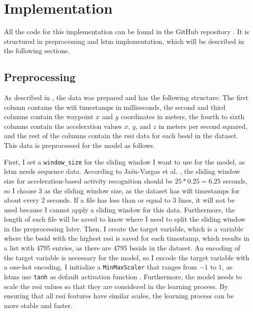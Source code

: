 \chapter{Implementation}\label{ch:implementation}


All the code for this implementation can be found in the GitHub repository \cite{github-repo}.
It is structured in preprocessing and \ac{lstm} implementation, which will be described in the following sections.

\section{Preprocessing}
As described in , the data was prepared and has the following structure:
The first column contains the \ac{wifi} timestamps in milliseconds, the second and third columns contain the waypoint  $x$ and $y$ coordinates  in meters, the fourth to sixth columns contain the acceleration  values $x$, $y$, and $z$ in meters per second squared, and the rest of the columns contain the \ac{rssi} data for each \ac{bssid} in the dataset.
This data is preprocessed for the model as follows.

First, I set a \texttt{window\_size} for the sliding window I want to use for the model, as \ac{lstm} needs sequence data.
According to Ja{\'e}n-Vargas et al. \cite{EffectsSlidingWindow2022}, the sliding window size for acceleration-based activity recognition should be \(25 * 0.25 = 6.25\) seconds, so I choose \(3\) as the sliding window size, as the dataset has \ac{wifi} timestamps for about every 2 seconds.
If a file has less than or equal to \(3\) lines, it will not be used because I cannot apply a sliding window for this data.
Furthermore, the length of each file will be saved to know where I need to split the sliding window in the preprocessing later.
Then, I create the target variable, which is a variable where the \ac{bssid} with the highest \ac{rssi} is saved for each timestamp, which results in a list with 4795 entries, as there are 4795 \acp{bssid} in the dataset.
An encoding of the target variable is necessary for the model, so I encode the target variable with a one-hot encoding.
I initialize a \texttt{MinMaxScaler} that ranges from \(-1\) to \(1\), as \acp{lstm} use \texttt{tanh} as default activation function \cite{tanh-lstm-default}.
Furthermore, the model needs to scale the \ac{rssi} values so that they are considered in the learning process.
By ensuring that all \ac{rssi} features have similar scales, the learning process can be more stable and faster. 

